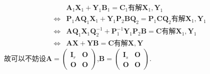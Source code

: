 \documentclass[lang=cn,newtx,10pt,scheme=chinese]{elegantbook}
\begin{document}
\begin{note}
\begin{align*}
&\boldsymbol{A}_1\boldsymbol{X}_1+\boldsymbol{Y}_1\boldsymbol{B}_1=\boldsymbol{C}_1\text{有解}\boldsymbol{X}_1,\boldsymbol{Y}_1\\
\Leftrightarrow&\boldsymbol{P}_1\boldsymbol{AQ}_1\boldsymbol{X}_1+\boldsymbol{Y}_1\boldsymbol{P}_2\boldsymbol{BQ}_2=\boldsymbol{P}_1\boldsymbol{CQ}_2\text{有解}\boldsymbol{X}_1,\boldsymbol{Y}_1\\
\Leftrightarrow&\boldsymbol{AQ}_1\boldsymbol{X}_1\boldsymbol{Q}_{2}^{-1}+\boldsymbol{P}_{1}^{-1}\boldsymbol{Y}_1\boldsymbol{P}_2\boldsymbol{B}=\boldsymbol{C}\text{有解}\boldsymbol{X}_1,\boldsymbol{Y}_1\\
\Leftrightarrow&\boldsymbol{AX}+\boldsymbol{YB}=\boldsymbol{C}\text{有解}\boldsymbol{X},\boldsymbol{Y}
\end{align*}
故可以不妨设\(\boldsymbol{A}=\begin{pmatrix}
\boldsymbol{I}_r & \boldsymbol{O} \\
\boldsymbol{O} & \boldsymbol{O}
\end{pmatrix}\),\(\boldsymbol{B}=\begin{pmatrix}
\boldsymbol{I}_s & \boldsymbol{O} \\
\boldsymbol{O} & \boldsymbol{O}
\end{pmatrix}\).
\end{note}
\end{document}
